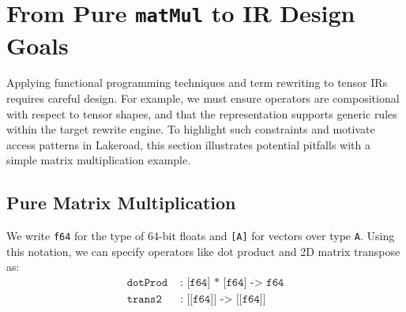\documentclass[prologue, dvipsnames, sigplan, screen, review, anonymous]{acmart}
\newcommand{\g}{Lakeroad\xspace}
\newcommand{\tcd}[1]{\texttt{#1}}
\newcommand{\mcd}[1]{\mathrm{\tcd{#1}}}
\begin{document}
\section{From Pure \texttt{matMul} to IR Design Goals}
\label{sec:matmul}

  
Applying functional programming techniques
  and term rewriting to tensor IRs
  requires careful design.
For example,
  we must ensure operators are compositional
  with respect to tensor shapes,
  and that the representation supports
  generic rules within the
  target rewrite engine.
To highlight such constraints and
  motivate access patterns in \g,
  this section illustrates potential pitfalls
  with a simple matrix multiplication example.

\subsection{Pure Matrix Multiplication}
\label{subsec:pure-matmul}

We write
  \tcd{f64} for the type of 64-bit floats and
  \tcd{[A]} for vectors over type \tcd{A}.
Using this notation, we can specify operators like
  dot product and 2D matrix transpose as:
\begin{align*}
    \mcd{dotProd} &
    \mcd{ : [f64] * [f64] -> f64} \\
    \mcd{trans2} &
    \mcd{ : [[f64]] -> [[f64]]}
\end{align*} 



\end{document}
